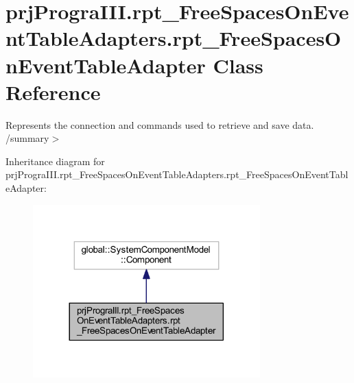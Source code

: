 \hypertarget{classprj_progra_i_i_i_1_1rpt___free_spaces_on_event_table_adapters_1_1rpt___free_spaces_on_event_table_adapter}{}\section{prj\+Progra\+I\+I\+I.\+rpt\+\_\+\+Free\+Spaces\+On\+Event\+Table\+Adapters.\+rpt\+\_\+\+Free\+Spaces\+On\+Event\+Table\+Adapter Class Reference}
\label{classprj_progra_i_i_i_1_1rpt___free_spaces_on_event_table_adapters_1_1rpt___free_spaces_on_event_table_adapter}


Represents the connection and commands used to retrieve and save data. /summary$>$  




Inheritance diagram for prj\+Progra\+I\+I\+I.\+rpt\+\_\+\+Free\+Spaces\+On\+Event\+Table\+Adapters.\+rpt\+\_\+\+Free\+Spaces\+On\+Event\+Table\+Adapter\+:
\nopagebreak
\begin{figure}[H]
\begin{center}
\leavevmode
\includegraphics[width=248pt]{classprj_progra_i_i_i_1_1rpt___free_spaces_on_event_table_adapters_1_1rpt___free_spaces_on_event_table_adapter__inherit__graph}
\end{center}
\end{figure}


